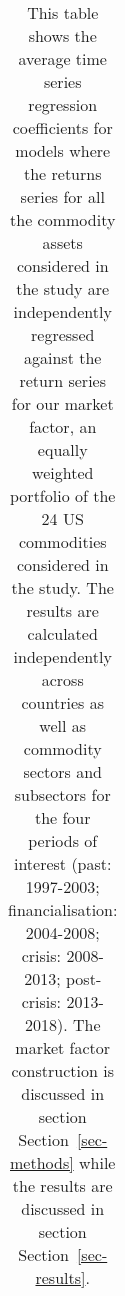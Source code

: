 \documentclass[
  authoryear,
  preprint,
  3p]{elsarticle}
\begin{document}
\begin{longtable}[t]{>{}l>{}l>{}l>{}r>{}r>{}r>{}r}

\caption{\label{tbl-regressions-index}This table shows the average time
series regression coefficients for models where the returns series for
all the commodity assets considered in the study are independently
regressed against the return series for our market factor, an equally
weighted portfolio of the 24 US commodities considered in the study. The
results are calculated independently across countries as well as
commodity sectors and subsectors for the four periods of interest (past:
1997-2003; financialisation: 2004-2008; crisis: 2008-2013; post-crisis:
2013-2018). The market factor construction is discussed in section
Section~\ref{sec-methods} while the results are discussed in section
Section~\ref{sec-results}.}

\tabularnewline


\end{longtable}
\end{document}
